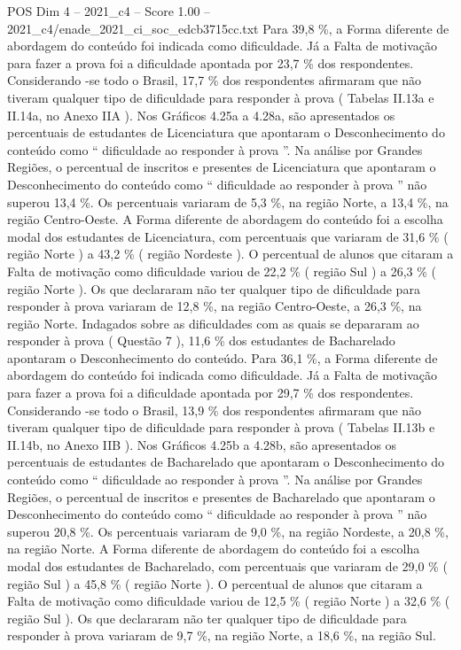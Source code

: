 \begin{textsample}{POS Dim 4 – 2021\_c4 – Score 1.00 – 2021\_c4/enade\_2021\_ci\_soc\_edcb3715cc.txt}
Para 39,8 \%, a Forma diferente de abordagem do conteúdo foi indicada como dificuldade.
Já a Falta de motivação para fazer a prova foi a dificuldade apontada por 23,7 \% dos respondentes.
Considerando -se todo o Brasil, 17,7 \% dos respondentes afirmaram que não tiveram qualquer tipo de dificuldade para responder à prova ( Tabelas II.13a e II.14a, no Anexo IIA ).
Nos Gráficos 4.25a a 4.28a, são apresentados os percentuais de estudantes de Licenciatura que apontaram o Desconhecimento do conteúdo como “ dificuldade ao responder à prova ”.
Na análise por Grandes Regiões, o percentual de inscritos e presentes de Licenciatura que apontaram o Desconhecimento do conteúdo como “ dificuldade ao responder à prova ” não superou 13,4 \%.
Os percentuais variaram de 5,3 \%, na região Norte, a 13,4 \%, na região Centro-Oeste.
A Forma diferente de abordagem do conteúdo foi a escolha modal dos estudantes de Licenciatura, com percentuais que variaram de 31,6 \% ( região Norte ) a 43,2 \% ( região Nordeste ).
O percentual de alunos que citaram a Falta de motivação como dificuldade variou de 22,2 \% ( região Sul ) a 26,3 \% ( região Norte ).
Os que declararam não ter qualquer tipo de dificuldade para responder à prova variaram de 12,8 \%, na região Centro-Oeste, a 26,3 \%, na região Norte.
Indagados sobre as dificuldades com as quais se depararam ao responder à prova ( Questão 7 ), 11,6 \% dos estudantes de Bacharelado apontaram o Desconhecimento do conteúdo.
Para 36,1 \%, a Forma diferente de abordagem do conteúdo foi indicada como dificuldade.
Já a Falta de motivação para fazer a prova foi a dificuldade apontada por 29,7 \% dos respondentes.
Considerando -se todo o Brasil, 13,9 \% dos respondentes afirmaram que não tiveram qualquer tipo de dificuldade para responder à prova ( Tabelas II.13b e II.14b, no Anexo IIB ).
Nos Gráficos 4.25b a 4.28b, são apresentados os percentuais de estudantes de Bacharelado que apontaram o Desconhecimento do conteúdo como “ dificuldade ao responder à prova ”.
Na análise por Grandes Regiões, o percentual de inscritos e presentes de Bacharelado que apontaram o Desconhecimento do conteúdo como “ dificuldade ao responder à prova ” não superou 20,8 \%.
Os percentuais variaram de 9,0 \%, na região Nordeste, a 20,8 \%, na região Norte.
A Forma diferente de abordagem do conteúdo foi a escolha modal dos estudantes de Bacharelado, com percentuais que variaram de 29,0 \% ( região Sul ) a 45,8 \% ( região Norte ).
O percentual de alunos que citaram a Falta de motivação como dificuldade variou de 12,5 \% ( região Norte ) a 32,6 \% ( região Sul ).
Os que declararam não ter qualquer tipo de dificuldade para responder à prova variaram de 9,7 \%, na região Norte, a 18,6 \%, na região Sul.

\end{textsample}
